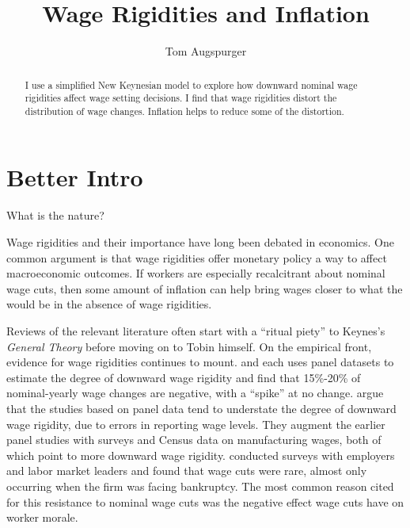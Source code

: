 \documentclass[12pt,a4paper]{scrartcl}            %
\begin{document}
\makeatletter
\def\blfootnote{\xdef\@thefnmark{}\@footnotetext}
\makeatother



\title{Wage Rigidities and Inflation}
\author{Tom Augspurger}                               %
\maketitle

\begin{abstract}
I use a simplified New Keynesian model to explore how downward nominal wage rigidities affect wage setting decisions.
I find that wage rigidities distort the distribution of wage changes.
Inflation helps to reduce some of the distortion.

\end{abstract}

\section{Better Intro}
\label{sec:better_intro}

What is the nature?

Wage rigidities and their importance have long been debated in economics.
One common argument is that wage rigidities offer monetary policy a way to affect macroeconomic outcomes.
If workers are especially recalcitrant about nominal wage cuts, then some amount of inflation can help bring wages closer to what the would be in the absence of wage rigidities.

Reviews of the relevant literature often start with a ``ritual piety'' \citep{tobin_1972} to Keynes's \emph{General Theory} before moving on to Tobin himself.
On the empirical front, evidence for wage rigidities continues to mount.
\cite{mclaughlin_1994} and \cite{card_hyslop_1997} each uses panel datasets to estimate the degree of downward wage rigidity and find that 15\%-20\% of nominal-yearly wage changes are negative, with a ``spike'' at no change.
\cite{akerlof_dickens_perry_1996} argue that the studies based on panel data tend to understate the degree of downward wage rigidity, due to errors in reporting wage levels.
They augment the earlier panel studies with surveys and Census data on manufacturing wages, both of which point to more downward wage rigidity.
\cite{bewley_1999} conducted surveys with employers and labor market leaders and found that wage cuts were rare, almost only occurring when the firm was facing bankruptcy.
The most common reason cited for this resistance to nominal wage cuts was the negative effect wage cuts have on worker morale.
\end{document}
